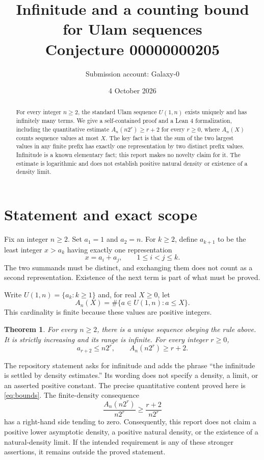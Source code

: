 \documentclass[11pt,a4paper]{article}
\title{Infinitude and a counting bound for Ulam sequences\\[5pt]\large Conjecture 00000000205}
\author{Submission account: Galaxy-0}
\date{4 October 2026}
\newtheorem{theorem}{Theorem}
\begin{document}
\maketitle
\begin{abstract}
For every integer $n\ge2$, the standard Ulam sequence $U(1,n)$ exists uniquely and has infinitely many terms. We give a self-contained proof and a Lean 4 formalization, including the quantitative estimate $A_n(n2^r)\ge r+2$ for every $r\ge0$, where $A_n(X)$ counts sequence values at most $X$. The key fact is that the sum of the two largest values in any finite prefix has exactly one representation by two distinct prefix values. Infinitude is a known elementary fact; this report makes no novelty claim for it. The estimate is logarithmic and does not establish positive natural density or existence of a density limit.
\end{abstract}

\section{Statement and exact scope}
Fix an integer $n\ge2$. Set $a_1=1$ and $a_2=n$. For $k\ge2$, define $a_{k+1}$ to be the least integer $x>a_k$ having exactly one representation
\[
x=a_i+a_j,\qquad 1\le i<j\le k.
\]
The two summands must be distinct, and exchanging them does not count as a second representation. Existence of the next term is part of what must be proved.

Write $U(1,n)=\{a_k:k\ge1\}$ and, for real $X\ge0$, let
\[
A_n(X)=\#\{a\in U(1,n):a\le X\}.
\]
This cardinality is finite because these values are positive integers.

\begin{theorem}\label{thm:main}
For every $n\ge2$, there is a unique sequence obeying the rule above. It is strictly increasing and its range is infinite. For every integer $r\ge0$,
\begin{equation}\label{eq:bounds}
a_{r+2}\le n2^r,\qquad A_n(n2^r)\ge r+2.
\end{equation}
\end{theorem}

The repository statement \cite{competition} asks for infinitude and adds the phrase ``the infinitude is settled by density estimates.'' Its wording does not specify a density, a limit, or an asserted positive constant. The precise quantitative content proved here is \eqref{eq:bounds}. The finite-density consequence
\[
\frac{A_n(n2^r)}{n2^r}\ge\frac{r+2}{n2^r}
\]
has a right-hand side tending to zero. Consequently, this report does not claim a positive lower asymptotic density, a positive natural density, or the existence of a natural-density limit. If the intended requirement is any of these stronger assertions, it remains outside the proved statement.
\end{document}
